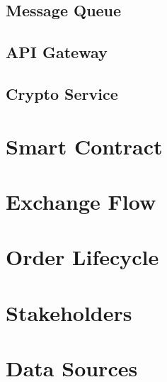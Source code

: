 \subsection{Message Queue}
\label{subsec:mq}

\subsection{API Gateway}
\label{subsec:mq}

\subsection{Crypto Service}
\label{subsec:crypto}

\section{Smart Contract}
\label{section:smart contract}

\section{Exchange Flow}
\label{section:exchange}

\section{Order Lifecycle}
\label{section:lifecycle}

\section{Stakeholders}
\label{section:stakeholders}

\section{Data Sources}
\label{section:datasource}

